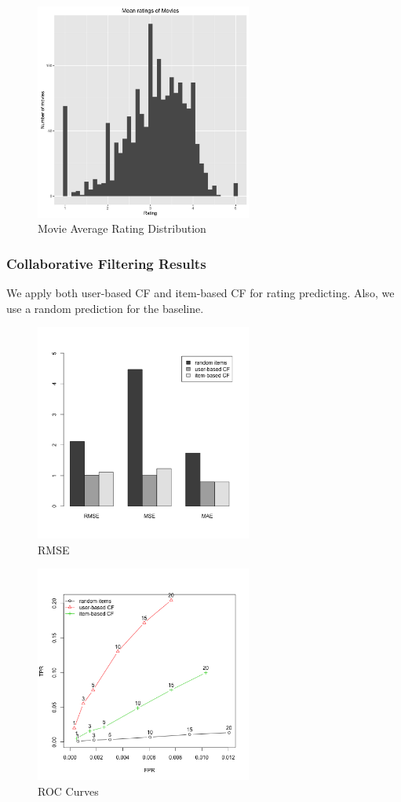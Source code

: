 \documentclass[conference]{IEEEtran}
\begin{document}
\begin{figure}
	\centering
	\includegraphics[width=2.8in]{movie_rating.png}
	\caption{Movie Average Rating Distribution}
	\label{fig:side:a}
\end{figure}

\subsubsection{Collaborative Filtering Results}
We apply both user-based CF and item-based CF for rating predicting. Also, we use a random prediction for the baseline.
\begin{figure}
	\centering
	\includegraphics[width=2.8in]{RMSE.png}
	\caption{RMSE}
	\label{fig:side:a}
\end{figure}

\begin{figure}
	\centering
	\includegraphics[width=2.8in]{ROC.png}
	\caption{ROC Curves}
	\label{fig:side:a}
\end{figure}
\end{document}
